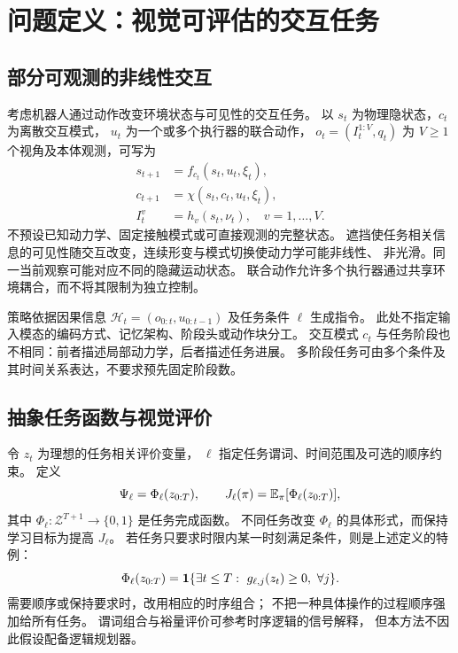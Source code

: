 \section{问题定义：视觉可评估的交互任务}
\label{sec:task}
\subsection{部分可观测的非线性交互}
考虑机器人通过动作改变环境状态与可见性的交互任务。
以 $s_t$ 为物理隐状态，$c_t$ 为离散交互模式，
$u_t$ 为一个或多个执行器的联合动作，
$o_t=(I_t^{1:V},q_t)$ 为 $V\ge1$ 个视角及本体观测，可写为
\begin{align}
 s_{t+1}&=f_{c_t}(s_t,u_t,\xi_t),\nonumber\\
 c_{t+1}&=\chi(s_t,c_t,u_t,\xi_t),\\
 I_t^v&=h_v(s_t,\nu_t),\quad v=1,\ldots,V.\nonumber
\end{align}
不预设已知动力学、固定接触模式或可直接观测的完整状态。
遮挡使任务相关信息的可见性随交互改变，连续形变与模式切换使动力学可能非线性、
非光滑。同一当前观察可能对应不同的隐藏运动状态。
联合动作允许多个执行器通过共享环境耦合，而不将其限制为独立控制。

策略依据因果信息
$\mathcal H_t=(o_{0:t},u_{0:t-1})$ 及任务条件 $\ell$ 生成指令。
此处不指定输入模态的编码方式、记忆架构、阶段头或动作块分工。
交互模式 $c_t$ 与任务阶段也不相同：前者描述局部动力学，后者描述任务进展。
多阶段任务可由多个条件及其时间关系表达，不要求预先固定阶段数。

\subsection{抽象任务函数与视觉评价}
令 $z_t$ 为理想的任务相关评价变量，
$\ell$ 指定任务谓词、时间范围及可选的顺序约束。
定义
\begin{equation}
 \Psi_\ell=\Phi_\ell(z_{0:T}),\qquad
 J_\ell(\pi)=\mathbb E_\pi[\Phi_\ell(z_{0:T})],
 \label{eq:visualtask}
\end{equation}
其中 $\Phi_\ell:\mathcal Z^{T+1}\to\{0,1\}$ 是任务完成函数。
不同任务改变 $\Phi_\ell$ 的具体形式，而保持学习目标为提高 $J_\ell$。
若任务只要求时限内某一时刻满足条件，则是上述定义的特例：
\begin{equation}
 \Phi_\ell(z_{0:T})
 =\mathbf 1\{\exists t\le T:\ g_{\ell,j}(z_t)\ge0,\ \forall j\}.
 \label{eq:genericgoal}
\end{equation}
需要顺序或保持要求时，改用相应的时序组合；
不把一种具体操作的过程顺序强加给所有任务。
谓词组合与裕量评价可参考时序逻辑的信号解释\cite{fainekos2009}，
但本方法不因此假设配备逻辑规划器。

